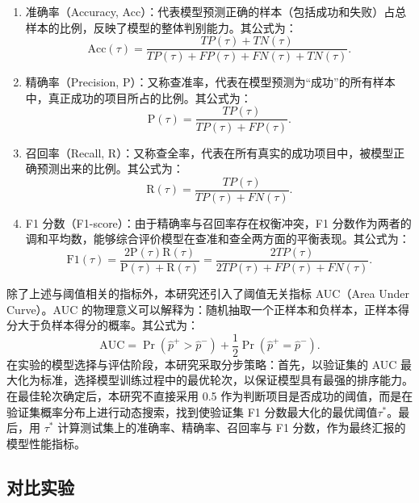 \begin{enumerate}[label=(\arabic*)]
  \item 准确率（Accuracy, Acc）：代表模型预测正确的样本（包括成功和失败）占总样本的比例，反映了模型的整体判别能力。其公式为：
  \begin{equation}
  \mathrm{Acc}(\tau)=\frac{TP(\tau)+TN(\tau)}{TP(\tau)+FP(\tau)+FN(\tau)+TN(\tau)}.
  \end{equation}
  \item 精确率（Precision, P）：又称查准率，代表在模型预测为“成功”的所有样本中，真正成功的项目所占的比例。其公式为：
  \begin{equation}
  \mathrm{P}(\tau)=\frac{TP(\tau)}{TP(\tau)+FP(\tau)}.
  \end{equation}
  \item 召回率（Recall, R）：又称查全率，代表在所有真实的成功项目中，被模型正确预测出来的比例。其公式为：
  \begin{equation}
  \mathrm{R}(\tau)=\frac{TP(\tau)}{TP(\tau)+FN(\tau)}.
  \end{equation}
  \item F1 分数（F1-score）：由于精确率与召回率存在权衡冲突，F1 分数作为两者的调和平均数，能够综合评价模型在查准和查全两方面的平衡表现。其公式为：
  \begin{equation}
  \mathrm{F1}(\tau)=\frac{2\mathrm{P}(\tau)\mathrm{R}(\tau)}{\mathrm{P}(\tau)+\mathrm{R}(\tau)}=\frac{2TP(\tau)}{2TP(\tau)+FP(\tau)+FN(\tau)}.
  \end{equation}
\end{enumerate}

除了上述与阈值相关的指标外，本研究还引入了阈值无关指标 AUC（Area Under Curve）。AUC 的物理意义可以解释为：随机抽取一个正样本和负样本，正样本得分大于负样本得分的概率。其公式为：
\begin{equation}
\mathrm{AUC}=\Pr(\hat{p}^+>\hat{p}^-)+\frac{1}{2}\Pr(\hat{p}^+=\hat{p}^-).
\end{equation}
在实验的模型选择与评估阶段，本研究采取分步策略：首先，以验证集的 AUC 最大化为标准，选择模型训练过程中的最优轮次，以保证模型具有最强的排序能力。在最佳轮次确定后，本研究不直接采用 0.5 作为判断项目是否成功的阈值，而是在验证集概率分布上进行动态搜索，找到使验证集 F1 分数最大化的最优阈值$ \tau^* $。最后，用 $ \tau^* $ 计算测试集上的准确率、精确率、召回率与 F1 分数，作为最终汇报的模型性能指标。

\subsection{对比实验}
